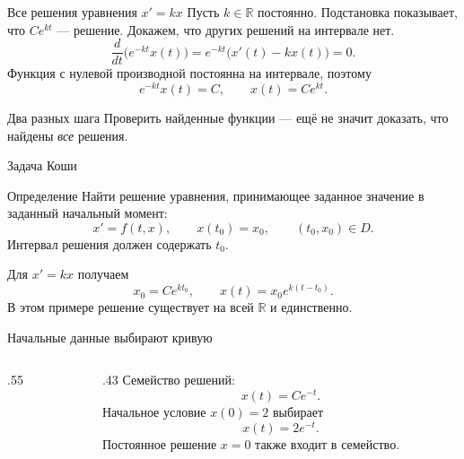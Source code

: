 \documentclass[aspectratio=169,11pt]{beamer}
\newcommand{\R}{\mathbb R}
\begin{document}
\begin{frame}{Все решения уравнения $x'=kx$}
  Пусть $k\in\R$ постоянно. Подстановка показывает, что $Ce^{kt}$ --- решение.
  Докажем, что других решений на интервале нет.
  \[
    \frac{d}{dt}\bigl(e^{-kt}x(t)\bigr)
    =e^{-kt}\bigl(x'(t)-kx(t)\bigr)=0.
  \]
  Функция с нулевой производной постоянна на интервале, поэтому
  \[
    e^{-kt}x(t)=C,\qquad \boxed{x(t)=Ce^{kt}}.
  \]
  \begin{block}{Два разных шага}
    Проверить найденные функции --- ещё не значит доказать,
    что найдены \emph{все} решения.
  \end{block}
\end{frame}

\begin{frame}{Задача Коши}
  \begin{block}{Определение}
    Найти решение уравнения, принимающее заданное значение
    в заданный начальный момент:
    \[
      \boxed{x'=f(t,x),\qquad x(t_0)=x_0},\qquad (t_0,x_0)\in D.
    \]
    Интервал решения должен содержать $t_0$.
  \end{block}
  Для $x'=kx$ получаем
  \[
    x_0=Ce^{kt_0},\qquad
    \boxed{x(t)=x_0e^{k(t-t_0)}}.
  \]
  В этом примере решение существует на всей $\R$ и единственно.
\end{frame}

\begin{frame}{Начальные данные выбирают кривую}
  \begin{columns}[c]
    \begin{column}{.55\textwidth}
      \centering
    \end{column}
    \begin{column}{.43\textwidth}
      Семейство решений:
      \[x(t)=Ce^{-t}.
      \]
      Начальное условие $x(0)=2$ выбирает
      \[x(t)=2e^{-t}.
      \]
      Постоянное решение $x=0$ также входит в семейство.
    \end{column}
  \end{columns}
\end{frame}
\end{document}
